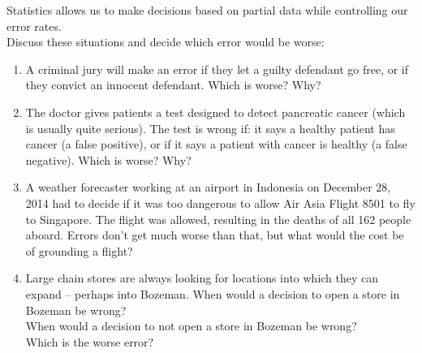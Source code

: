 Statistics allows us to make decisions based on partial data  while
controlling our error rates.\\
Discuss these situations and decide which error would be worse:\vspace{-.6cm}
\begin{enumerate}
\item A criminal jury will make an error if
      they let a guilty defendant go free, or if
      they convict an innocent defendant.
     Which is worse? Why?
\begin{students}
  \vspace{1.5cm}
\end{students}

\item The doctor gives patients a test designed to detect pancreatic
  cancer (which is usually quite serious).  The test is wrong if:
  it says a healthy patient has cancer (a false positive), or if
  it says a patient with cancer is healthy (a false negative).  Which
  is worse?  Why? 
\begin{students}
  \vspace{1.5cm}
\end{students}

\item  A weather forecaster working at an airport in Indonesia on
  December 28, 2014 had to decide if it was too dangerous
   to allow Air Asia Flight 8501 to fly to
  Singapore.  The flight was allowed, resulting in the deaths of all
  162 people aboard.  Errors don't get much worse than that, but what
  would the cost be of grounding a flight?  
\begin{students}
  \vspace{2.5cm}
\end{students}



\item  Large chain stores are always looking for locations into which
  they can expand -- perhaps into Bozeman. 
  When would a  decision to open a store in Bozeman  be wrong?\\
  When would a decision to not open a store in Bozeman  be
  wrong?\\
  Which is the worse error?  
\begin{students}
  \vspace{3cm}
\end{students}

\end{enumerate}

